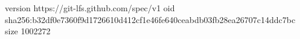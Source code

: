version https://git-lfs.github.com/spec/v1
oid sha256:b32df0e7360f9d1726610d412cf1e46fe640ceabdb03fb28ea26707c14ddc7bc
size 1002272
